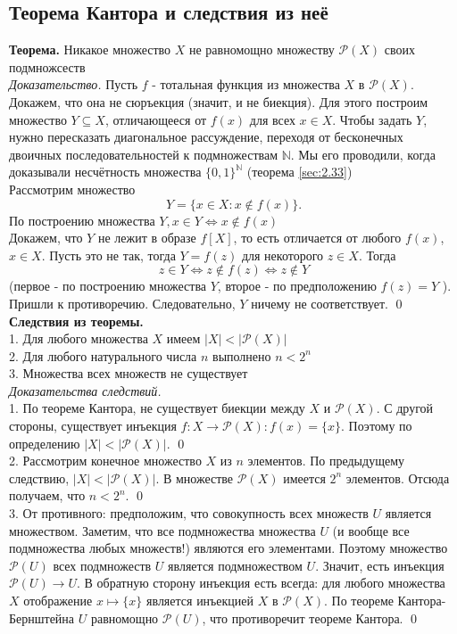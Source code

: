 \documentclass[a4paper]{article}
\begin{document}
\subsection{Теорема Кантора и следствия из неё}
\textbf{Теорема.} Никакое множество $X$ не равномощно множеству $\mathcal{P}(X)$ своих подмножсеств\\[2mm]
\textit{Доказательство.} Пусть $f$ - тотальная функция из множества $X$ в $\mathcal{P}(X)$. Докажем, что она не сюръекция (значит, и не биекция). Для этого построим множество $Y \subseteq X$, отличающееся от $f(x)$ для всех $x \in X$. Чтобы задать $Y$, нужно пересказать диагональное рассуждение, переходя от бесконечных двоичных последовательностей к подмножествам $\mathbb{N}$. Мы его проводили, когда доказывали несчётность множества $\{0,1\}^{\mathbb{N}}$ (теорема \ref{sec:2.33})\\[2mm]
Рассмотрим множество
$$
Y=\{x \in X: x \notin f(x)\} .
$$
По построению множества $Y, x \in Y \Leftrightarrow x \notin f(x)$\\[2mm]
 Докажем, что $Y$ не лежит в образе $f[X]$, то есть отличается от любого $f(x)$, $x \in X$. Пусть это не так, тогда $Y=f(z)$ для некоторого $z \in X$. Тогда
$$
z \in Y \Leftrightarrow z \notin f(z) \Leftrightarrow z \notin Y
$$
(первое - по построению множества $Y$, второе - по предположению $f(z)=Y$ ). Пришли к противоречию. Следовательно, $Y$ ничему не соответствует. \qed\\[2mm]
\textbf{Следствия из теоремы.}\\[2mm]
 1. Для любого множества $X$ имеем $|X|<|\mathcal{P}(X)|$\\[2mm]
 2. Для любого натурального числа $n$ выполнено $n<2^{n}$\\[2mm]
 3. Множества всех множеств не существует\\[2mm]
\textit{Доказательства следствий.}\\[2mm]
 1. По теореме Кантора, не существует биекции между $X$ и $\mathcal{P}(X)$. С другой стороны, существует инъекция $f: X \rightarrow \mathcal{P}(X): f(x)=\{x\}$. Поэтому по определению $|X|<|\mathcal{P}(X)|$. \qed\\[2mm]
 2. Рассмотрим конечное множество $X$ из $n$ элементов. По предыдущему следствию, $|X|<|\mathcal{P}(X)|$. В множестве $\mathcal{P}(X)$ имеется $2^{n}$ элементов. Отсюда получаем, что $n<2^{n}$. \qed\\[2mm]
 3. От противного: предположим, что совокупность всех множеств $U$ является множеством. Заметим, что все подмножества множества $U$ (и вообще все подмножества любых множеств!) являются его элементами. Поэтому множество $\mathcal{P}(U)$ всех подмножеств $U$ является подмножеством $U$. Значит, есть инъекция $\mathcal{P}(U) \rightarrow U$. В обратную сторону инъекция есть всегда: для любого множества $X$ отображение $x \mapsto\{x\}$ является инъекцией $X$ в $\mathcal{P}(X)$. По теореме Кантора-Бернштейна $U$ равномощно $\mathcal{P}(U)$, что противоречит теореме Кантора. \qed
\end{document}
